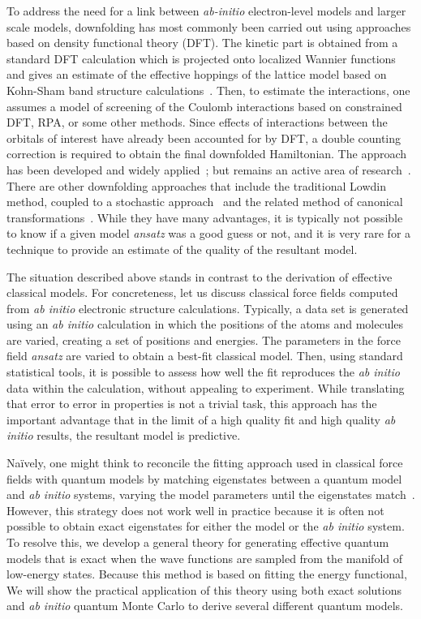 To address the need for a link between {\it ab-initio} electron-level models and larger scale models, downfolding has most commonly been carried out using approaches based on density functional theory (DFT). 
The kinetic part is obtained from a standard DFT calculation which is projected onto localized Wannier functions and gives an estimate of the effective hoppings of the lattice model based on Kohn-Sham band structure calculations~\cite{Pavirini}. 
Then, to estimate the interactions, one assumes a model of screening of the Coulomb interactions based on constrained DFT, RPA, or some other methods. 
Since effects of interactions between the orbitals of interest have already been accounted for by DFT, a double counting correction is required to obtain the final downfolded Hamiltonian. 
The approach has been developed and widely applied~\cite{Pavirini, Dasgupta, Aryasetiawan2004, Jeschke2013}; but remains an active area of research~\cite{Haule_doublecounting}.
There are other downfolding approaches that include the traditional Lowdin method, coupled to a stochastic approach~\cite{Tenno,Zhou_Ceperley} and the related method of canonical transformations~\cite{White_CT, Yanai_CT}. 
While they have many advantages, it is typically not possible to know if a given model {\it ansatz} was a good guess or not, and it is very rare for a technique to provide an estimate of the quality of the resultant model. 

The situation described above stands in contrast to the derivation of effective classical models. 
For concreteness, let us discuss classical force fields computed from {\it ab initio} electronic structure calculations. 
Typically, a data set is generated using an {\it ab initio} calculation in which the positions of the atoms and molecules are varied, creating a set of positions and energies. 
The parameters in the force field {\it ansatz} are varied to obtain a best-fit classical model.
Then, using standard statistical tools, it is possible to assess how well the fit reproduces the {\it ab initio} data within the calculation, without appealing to experiment. 
While translating that error to error in properties is not a trivial task, this approach has the important advantage that in the limit of a high quality fit and high quality {\it ab initio} results, the resultant model is predictive.

Na\"ively, one might think to reconcile the fitting approach used in classical force fields with quantum models by matching eigenstates between a quantum model and {\it ab initio} systems, varying the model parameters until the eigenstates match~\cite{Wagner2013}. 
However, this strategy does not work well in practice because it is often not possible to obtain exact eigenstates for either the model or the {\it ab initio} system.
To resolve this, we develop a general theory for generating effective quantum models that is exact when the wave functions are sampled from the manifold of low-energy states. 
Because this method is based on fitting the energy functional, 
We will show the practical application of this theory using both exact solutions and {\it ab initio} quantum Monte Carlo to derive several different quantum models.

